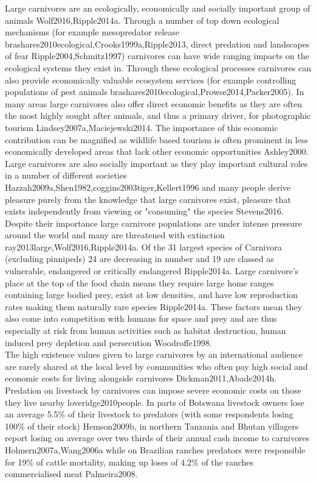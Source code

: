 Large carnivores are an ecologically, economically and socially important group of animals {Wolf2016,Ripple2014a}. Through a number of top down ecological mechanisms (for example mesopredator release {brashares2010ecological,Crooks1999a,Ripple2013}, direct predation and landscapes of fear {Ripple2004,Schmitz1997}) carnivores can have wide ranging impacts on the ecological systems they exist in. Through these ecological processes carnivores can also provide economically valuable ecosystem services (for example controlling populations of pest animals {brashares2010ecological,Prowse2014,Packer2005}). In many areas large carnivores also offer direct economic benefits as they are often the most highly sought after animals, and thus a primary driver, for photographic tourism {Lindsey2007a,Maciejewski2014}. The importance of this economic contribution can be magnified as wildlife based tourism is often prominent in less economically developed areas that lack other economic opportunities {Ashley2000}. Large carnivores are also socially important as they play important cultural roles in a number of different societies {Hazzah2009a,Shen1982,coggins2003tiger,Kellert1996} and many people derive pleasure purely from the knowledge that large carnivores exist, pleasure that exists independently from viewing or "consuming" the species {Stevens2016}.\\

Despite their importance large carnivore populations are under intense pressure around the world and many are threatened with extinction {ray2013large,Wolf2016,Ripple2014a}. Of the 31 largest species of Carnivora (excluding pinnipeds) 24 are decreasing in number and 19 are classed as vulnerable, endangered or critically endangered {Ripple2014a}. Large carnivore's place at the top of the food chain means they require large home ranges containing large bodied prey, exist at low densities, and have low reproduction rates making them naturally rare species {Ripple2014a}. These factors mean they also come into competition with humans for space and prey and are thus especially at risk from human activities such as habitat destruction, human induced prey depletion and persecution {Woodroffe1998}.\\

The high existence values given to large carnivores by an international audience are rarely shared at the local level by communities who often pay high social and economic costs for living alongside carnivores {Dickman2011,Abade2014h}. Predation on livestock by carnivores can impose severe economic costs on those they live nearby {loveridge2010people}. In parts of Botswana livestock owners lose an average 5.5\% of their livestock to predators (with some respondents losing 100\% of their stock) {Hemson2009b}, in northern Tanzania and Bhutan villagers report losing on average over two thirds of their annual cash income to carnivores {Holmern2007a,Wang2006a} while on Brazilian ranches predators were responsible for 19\% of cattle mortality, making up loses of 4.2\% of the ranches commercialised meat {Palmeira2008}.\\


